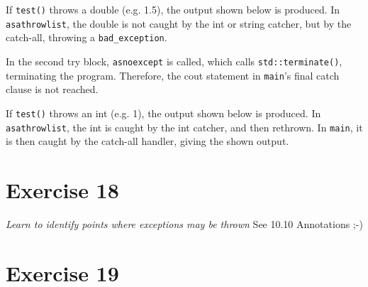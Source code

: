 \documentclass[12pt]{article}
\newcommand{\desc}[1]{\textit{#1} \vspace{1em}}
\begin{document}









If \texttt{test()} throws a double (e.g. 1.5), the output shown below is produced. In \texttt{asathrowlist}, the double is not caught by the int or string catcher, but by the catch-all, throwing a \texttt{bad\_exception}. 

In the second try block, \texttt{asnoexcept} is called, which calls \texttt{std::terminate()}, terminating the program. Therefore, the cout statement in \texttt{main}'s final catch clause is not reached. 



If \texttt{test()} throws an int (e.g. 1), the output shown below is produced. In \texttt{asathrowlist}, the int is caught by the int catcher, and then rethrown. In \texttt{main}, it is then caught by the catch-all handler, giving the shown output. 





\clearpage
\section*{Exercise 18}
\desc{Learn to identify points where exceptions may be thrown}
See 10.10 Annotations ;-)

\clearpage
\section*{Exercise 19}
\desc{}


\clearpage
\end{document}

